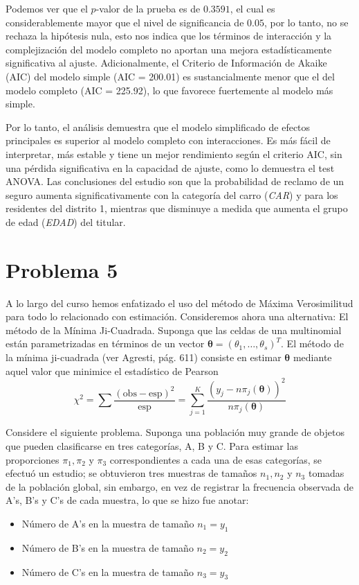 Podemos ver que el $p$-valor de la prueba es de $0.3591$, el cual es considerablemente mayor que el nivel de significancia de $0.05$, por lo tanto, no se rechaza la hipótesis nula, esto nos indica que los términos de interacción y la complejización del modelo completo no aportan una mejora estadísticamente significativa al ajuste. Adicionalmente, el Criterio de Información de Akaike (AIC) del modelo simple (AIC = 200.01) es sustancialmente menor que el del modelo completo (AIC = 225.92), lo que favorece fuertemente al modelo más simple.

\begin{tcolorbox}
Por lo tanto, el análisis demuestra que el modelo simplificado de efectos principales es superior al modelo completo con interacciones. Es más fácil de interpretar, más estable y tiene un mejor rendimiento según el criterio AIC, sin una pérdida significativa en la capacidad de ajuste, como lo demuestra el test ANOVA. Las conclusiones del estudio son que la probabilidad de reclamo de un seguro aumenta significativamente con la categoría del carro (\textit{CAR}) y para los residentes del distrito 1, mientras que disminuye a medida que aumenta el grupo de edad (\textit{EDAD}) del titular.
\end{tcolorbox}

\newpage

\section*{Problema \textcolor{CIMATRed}{5}}

A lo largo del curso hemos enfatizado el uso del método de Máxima Verosimilitud para todo lo relacionado con estimación. Consideremos ahora una alternativa: El método de la Mínima Ji-Cuadrada. Suponga que las celdas de una multinomial están parametrizadas en términos de un vector $\boldsymbol{\theta} = (\theta_1, \dots, \theta_s)^T$. El método de la mínima ji-cuadrada (ver Agresti, pág. 611) consiste en estimar $\boldsymbol{\theta}$ mediante aquel valor que minimice el estadístico de Pearson
\[
\chi^2 = \sum \frac{(\text{obs} - \text{esp})^2}{\text{esp}} = \sum_{j=1}^K \frac{(y_j - n\pi_j(\boldsymbol{\theta}))^2}{n\pi_j(\boldsymbol{\theta})}
\]

Considere el siguiente problema. Suponga una población muy grande de objetos que pueden clasificarse en tres categorías, A, B y C. Para estimar las proporciones $\pi_1, \pi_2$ y $\pi_3$ correspondientes a cada una de esas categorías, se efectuó un estudio; se obtuvieron tres muestras de tamaños $n_1, n_2$ y $n_3$ tomadas de la población global, sin embargo, en vez de registrar la frecuencia observada de A's, B's y C's de cada muestra, lo que se hizo fue anotar:
\begin{itemize}
    \item Número de A's en la muestra de tamaño $n_1 = y_1$
    \item Número de B's en la muestra de tamaño $n_2 = y_2$
    \item Número de C's en la muestra de tamaño $n_3 = y_3$
\end{itemize}

